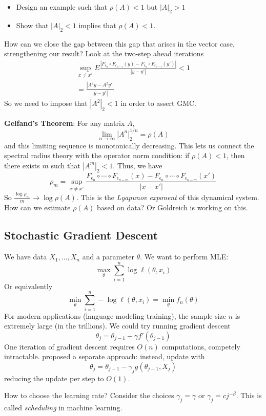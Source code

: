 \begin{itemize}
\tightlist
\item
  Design an example such that \(\rho(A) < 1\) but \(|A|_2 > 1\)
\item
  Show that \(|A|_2 < 1\) implies that \(\rho(A) < 1\).
\end{itemize}

How can we close the gap between this gap that arises in the vector case, strengthening our result? Look at the two-step ahead iterations
\[\begin{gathered}\sup_{x \neq x'} E \frac{|F_{\epsilon_n} \circ F_{\epsilon_{n-1}}(y) - F_{\epsilon_n} \circ F_{\epsilon_{n-1}}(y')|}{|y - y'|} < 1 \\
= \frac{|A^2 y - A^2 y'|}{|y - y'|}\end{gathered}\]
So we need to impose that \(|A^2|_2 < 1\) in order to assert GMC.

\textbf{Gelfand's Theorem}: For any matrix \(A\),
\[\lim_{n \to \infty} |A^n|_2^{1/n} = \rho(A)\]
and this limiting sequence is monotonically decreasing. This lets us connect the spectral radius theory with the operator norm condition: if \(\rho(A) < 1\), then there exists \(m\) such that \(|A^m|_2 < 1\). Thus, we have
\[\rho_m = \sup_{x \neq x'} \frac{F_{\epsilon_n} \circ \cdots \circ F_{\epsilon_{n-m}}(x) - F_{\epsilon_n} \circ \cdots \circ F_{\epsilon_{n-m}}(x')}{|x - x'|}\]
So \(\frac{\log \rho_m}{m} \to \log \rho(A)\). This is the \emph{Lyapunov exponent} of this dynamical system. How can we estimate \(\rho(A)\) based on data? Or Goldreich is working on this.

\subsection*{Stochastic Gradient Descent}
We have data \(X_1, \dots, X_n\) and a parameter \(\theta\). We want to perform MLE:
\[\max_\theta \sum_{i=1}^n \log \ell(\theta, x_i)\]
Or equivalently
\[\min_\theta \sum_{i=1}^n -\log \ell(\theta, x_i) = \min_\theta f_n(\theta)\]
For modern applications (language modeling training), the sample size \(n\) is extremely large (in the trillions). We could try running gradient descent
\[\theta_j = \theta_{j-1} - \gamma f'(\theta_{j-1})\]
One iteration of gradient descent requires \(O(n)\) computations, competely intractable. \citet{RM51} proposed a separate approach: instead, update with
\[\theta_j = \theta_{j-1} - \gamma_j g(\theta_{j-1}, X_j)\]
reducing the update per step to \(O(1)\).

How to choose the learning rate? Consider the choices \(\gamma_j = \gamma\) or \(\gamma_j = c j^{-\beta}\). This is called \emph{scheduling} in machine learning.

